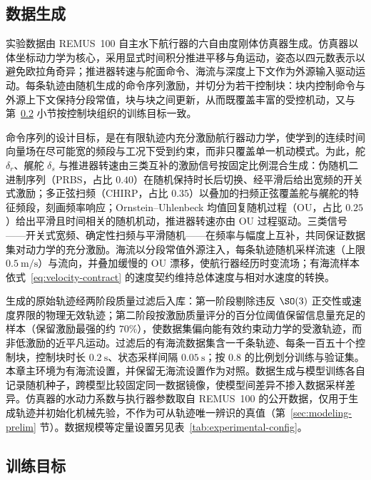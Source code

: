 \subsection{数据生成}
\label{subsec:data-generation}

实验数据由 REMUS~100 自主水下航行器的六自由度刚体仿真器生成。仿真器以体坐标动力学为核心，采用显式时间积分推进平移与角运动，姿态以四元数表示以避免欧拉角奇异；推进器转速与舵面命令、海流与深度上下文作为外源输入驱动运动。每条轨迹由随机生成的命令序列激励，并切分为若干控制块：块内控制命令与外源上下文保持分段常值，块与块之间更新，从而既覆盖丰富的受控机动，又与第~\ref{subsec:training-objective} 小节按控制块组织的训练目标一致。

命令序列的设计目标，是在有限轨迹内充分激励航行器动力学，使学到的连续时间向量场在尽可能宽的频段与工况下受到约束，而非只覆盖单一机动模式。为此，舵 \(\delta_r\)、艉舵 \(\delta_s\) 与推进器转速由三类互补的激励信号按固定比例混合生成：伪随机二进制序列（PRBS，占比 \(0.40\)）在随机保持时长后切换、经平滑后给出宽频的开关式激励；多正弦扫频（CHIRP，占比 \(0.35\)）以叠加的扫频正弦覆盖舵与艉舵的特征频段，刻画频率响应；Ornstein--Uhlenbeck 均值回复随机过程（OU，占比 \(0.25\)）给出平滑且时间相关的随机机动，推进器转速亦由 OU 过程驱动。三类信号——开关式宽频、确定性扫频与平滑随机——在频率与幅度上互补，共同保证数据集对动力学的充分激励。海流以分段常值外源注入，每条轨迹随机采样流速（上限 \(0.5~\mathrm{m/s}\)）与流向，并叠加缓慢的 OU 漂移，使航行器经历时变流场；有海流样本依式~\eqref{eq:velocity-contract} 的速度契约维持总体速度与相对水速度的转换。

生成的原始轨迹经两阶段质量过滤后入库：第一阶段剔除违反 \(\SO(3)\) 正交性或速度界限的物理无效轨迹；第二阶段按激励质量评分的百分位阈值保留信息量充足的样本（保留激励最强的约 \(70\%\)），使数据集偏向能有效约束动力学的受激轨迹，而非低激励的近平凡运动。过滤后的有海流数据集含一千条轨迹、每条一百五十个控制块，控制块时长 \(0.2~\mathrm{s}\)、状态采样间隔 \(0.05~\mathrm{s}\)；按 \(0.8\) 的比例划分训练与验证集。本章主环境为有海流设置，并保留无海流设置作为对照。数据生成与模型训练各自记录随机种子，跨模型比较固定同一数据镜像，使模型间差异不掺入数据采样差异。仿真器的水动力系数与执行器参数取自 REMUS~100 的公开数据，仅用于生成轨迹并初始化机械先验，不作为可从轨迹唯一辨识的真值（第~\ref{sec:modeling-prelim} 节）。数据规模等定量设置另见表~\ref{tab:experimental-config}。

\subsection{训练目标}
\label{subsec:training-objective}

